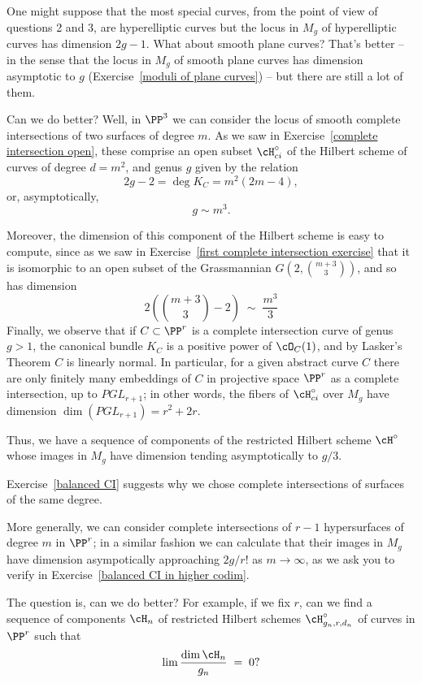 One might suppose that the most special curves, from the point of view of questions 2 and 3, are hyperelliptic curves but the locus in $M_g$ of hyperelliptic curves has dimension $2g-1$. What about smooth plane curves? That's better -- in the sense that the locus in $M_g$ of smooth plane curves has dimension asymptotic to $g$ (Exercise~\ref{moduli of plane curves}) -- but there are still a lot of them.


Can we do better?  Well, in $\PP^3$ we can consider the locus of smooth complete intersections of two surfaces of degree $m$. As we saw in Exercise~\ref{complete intersection open}, these comprise an open subset $\cH^\circ_{ci}$ of the Hilbert scheme of curves of degree $d = m^2$, and genus $g$ given by the relation
$$
2g-2 = \deg K_C = m^2(2m-4),
$$
or, asymptotically,
$$
g \sim m^3.
$$

Moreover, the dimension of this component of the Hilbert scheme is easy to compute, since as we saw in Exercise~\ref{first complete intersection exercise} that it is isomorphic to an open subset of the Grassmannian $G(2, \binom{m+3}{3})$, and so has dimension
$$
2(\binom{m+3}{3} - 2) \; \sim \; \frac{m^3}{3}
$$
Finally, we observe that if $C \subset \PP^r$ is a complete intersection curve of genus $g >1$, the canonical bundle $K_C$ is a positive power of $\cO_C(1)$, and by Lasker's Theorem $C$ is linearly normal. In particular, for a given abstract curve $C$ there are only finitely many embeddings of $C$ in projective space $\PP^r$ as a complete intersection, up to $PGL_{r+1}$; in other words, the fibers of $\cH^\circ_{ci}$ over $M_g$ have dimension $\dim(PGL_{r+1}) = r^2 + 2r$. 

Thus, we have a sequence of components of the restricted Hilbert scheme $\cH^\circ$ whose images in $M_g$ have dimension tending asymptotically to $g/3$.

Exercise~\ref{balanced CI}  suggests why we chose complete intersections of surfaces of the same degree.


More generally, we can consider complete intersections of $r-1$ hypersurfaces of degree $m$ in $\PP^r$; in a similar fashion we can calculate that their images in $M_g$ have dimension asympotically approaching $2g/r!$ as $m \to \infty$, as we ask you to verify in Exercise~\ref{balanced CI in higher codim}.


The question is, can we do better? For example, if we fix $r$, can we find a sequence of components $\cH_n$ of  restricted Hilbert schemes  $\cH^\circ_{g_n,r,d_n}$ of curves in $\PP^r$ such that
$$
\lim \frac{\dim \cH_n}{g_n} \; = \; 0?
$$

